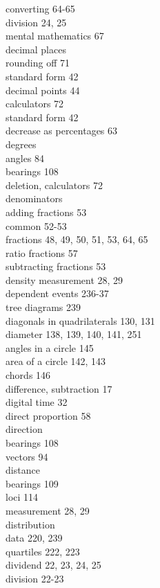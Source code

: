 \documentclass[10pt]{article}
\begin{document}
converting 64-65\\
division 24, 25\\
mental mathematics 67\\
decimal places\\
rounding off 71\\
standard form 42\\
decimal points 44\\
calculators 72\\
standard form 42\\
decrease as percentages 63\\
degrees\\
angles 84\\
bearings 108\\
deletion, calculators 72\\
denominators\\
adding fractions 53\\
common 52-53\\
fractions 48, 49, 50, 51, 53, 64, 65\\
ratio fractions 57\\
subtracting fractions 53\\
density measurement 28, 29\\
dependent events 236-37\\
tree diagrams 239\\
diagonals in quadrilaterals 130, 131\\
diameter 138, 139, 140, 141, 251\\
angles in a circle 145\\
area of a circle 142, 143\\
chords 146\\
difference, subtraction 17\\
digital time 32\\
direct proportion 58\\
direction\\
bearings 108\\
vectors 94\\
distance\\
bearings 109\\
loci 114\\
measurement 28, 29\\
distribution\\
data 220, 239\\
quartiles 222, 223\\
dividend 22, 23, 24, 25\\
division 22-23\\
\end{document}
